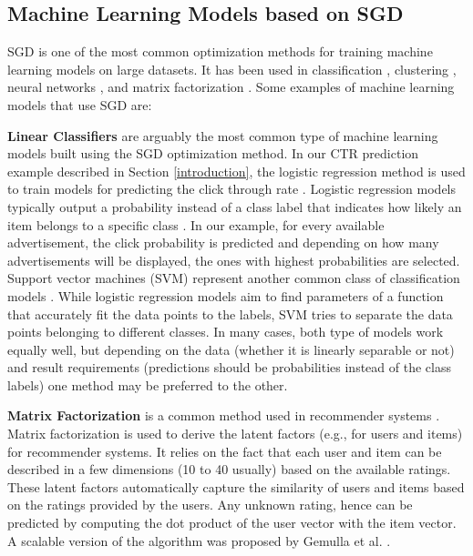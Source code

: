 \documentclass{vldb}
\begin{document}
\subsection{Machine Learning Models based on SGD}
SGD is one of the most common optimization methods for training machine learning models on large datasets. 
It has been used in classification \cite{zhang2004solving}, clustering \cite{bottou1995convergence}, neural networks \cite{dean2012large}, and matrix factorization \cite{funk2006netflix}.
Some examples of machine learning models that use SGD are: 

\textbf{Linear Classifiers} are arguably the most common type of machine learning models built using the SGD optimization method. 
In our CTR prediction example described in Section \ref{introduction}, the logistic regression method is used to train models for predicting the click through rate \cite{macmahan2013}. 
Logistic regression models typically output a probability instead of a class label that indicates how likely an item belongs to a specific class \cite{hosmer2013applied}.
In our example, for every available advertisement, the click probability is predicted and depending on how many advertisements will be displayed, the ones with highest probabilities are selected.
Support vector machines (SVM) represent another common class of classification models \cite{steinwart2008support}.
While logistic regression models aim to find parameters of a function that accurately fit the data points to the labels, SVM tries to separate the data points belonging to different classes. 
In many cases, both type of models work equally well, but depending on the data (whether it is linearly separable or not) and result requirements (predictions should be probabilities instead of the class labels) one method may be preferred to the other.

\textbf{Matrix Factorization} is a common method used in recommender systems \cite{koren2009matrix}. 
Matrix factorization is used to derive the latent factors (e.g., for users and items) for recommender systems.
It relies on the fact that each user and item can be described in a few dimensions (10 to 40 usually) based on the available ratings.
These latent factors automatically capture the similarity of users and items based on the ratings provided by the users.
Any unknown rating, hence can be predicted by computing the dot product of the user vector with the item vector.
A scalable version of the algorithm was proposed by Gemulla et al. \cite{gemulla2011large}.
\end{document}

